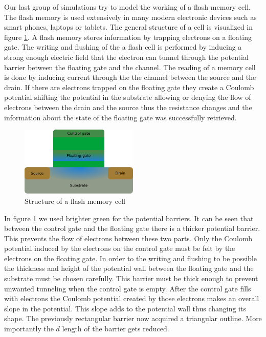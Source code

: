 Our last group of simulations try to model the working of a flash memory cell.
The flash memory is used extensively in many modern electronic devices such as smart phones, laptops or tablets.
The general structure of a cell is visualized in figure \ref{fig:flash_memory}.
A flash memory stores information by trapping electrons on a floating gate.
The writing and flushing of the a flash cell is performed by inducing a strong enough electric field that the electron can tunnel through the potential barrier between the floating gate and the channel.
The reading of a memory cell is done by inducing current through the the channel between the source and the drain.
If there are electrons trapped on the floating gate they create a Coulomb potential shifting the potential in the substrate allowing or denying the flow of electrons between the drain and the source thus the resistance changes and the information about the state of the floating gate was successfully retrieved.
\begin{figure}
	\centering
	\includegraphics[width=0.5\textwidth]{figures/flash_memory.pdf}
	\caption{Structure of a flash memory cell}
	\label{fig:flash_memory}
\end{figure}
In figure \ref{fig:flash_memory} we used brighter green for the potential barriers.
It can be seen that between the control gate and the floating gate there is a thicker potential barrier.
This prevents the flow of electrons between these two parts.
Only the Coulomb potential induced by the electrons on the control gate must be felt by the electrons on the floating gate.
In order to the writing and flushing to be possible the thickness and height of the potential wall between the floating gate and the substrate must be chosen carefully.
This barrier must be thick enough to prevent unwanted tunneling when the control gate is empty.
After the control gate fills with electrons the Coulomb potential created by those electrons makes an overall slope in the potential.
This slope adds to the potential wall thus changing its shape.
The previously rectangular barrier now acquired a triangular outline. More importantly the $d$ length of the barrier gets reduced.
